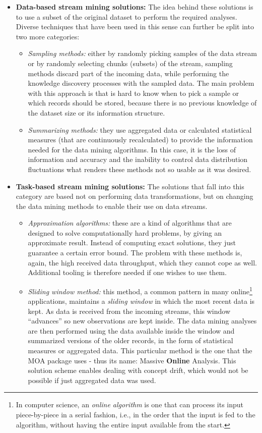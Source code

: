 \begin{itemize}
	\item \textbf{Data-based stream mining solutions:}
	The idea behind these solutions is to use a subset of the original dataset to perform the required analyses. Diverse techniques that have been used in this sense can further be split into two more categories:
	\begin{itemize}
		 \item \textit{Sampling methods:} either by randomly picking samples of the data stream or by randomly selecting chunks (subsets) of the stream, sampling methods discard part of the incoming data, while performing the knowledge discovery processes with the sampled data. The main problem with this approach is that is hard to know when to pick a sample or which records should be stored, because there is no previous knowledge of the dataset size or its information structure.
		 
		 \item \textit{Summarizing methods:} they use aggregated data or calculated statistical measures (that are continuously recalculated) to provide the information needed for the data mining algorithms. In this case, it is the loss of information and accuracy and the inability to control data distribution fluctuations what renders these methods not so usable as it was desired.
	\end{itemize}
	
	\item \textbf{Task-based stream mining solutions:}
	The solutions that fall into this category are based not on performing data transformations, but on changing the data mining methods to enable their use on data streams.
	\begin{itemize}
		\item \textit{Approximation algorithms:} these are a kind of algorithms that are designed to solve computationally hard problems, by giving an approximate result. Instead of computing exact solutions, they just guarantee a certain error bound. The problem with these methods is, again, the high received data throughput, which they cannot cope as well. Additional tooling is therefore needed if one wishes to use them.
		
		\item \textit{Sliding window method:} this method, a common pattern in many online\footnote{In computer science, an \textit{online algorithm} is one that can process its input piece-by-piece in a serial fashion, i.e., in the order that the input is fed to the algorithm, without having the entire input available from the start.} applications, maintains a \textit{sliding window} in which the most recent data is kept. As data is received from the incoming streams, this window “advances” so new observations are kept inside. The data mining analyses are then performed using the data available inside the window and summarized versions of the older records, in the form of statistical measures or aggregated data.
		This particular method is the one that the MOA package uses - thus its name: Massive \textbf{Online} Analysis. This solution scheme enables dealing with concept drift, which would not be possible if just aggregated data was used.
		

\end{itemize}
\end{itemize}
